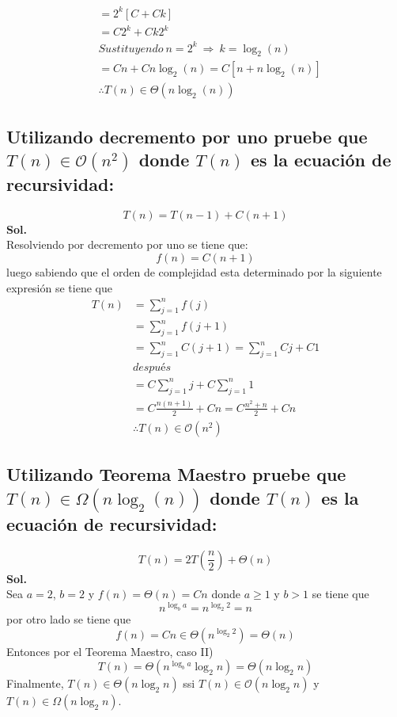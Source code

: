 \documentclass[12pt,twoside]{article}
\begin{document}
        \begin{align}
            &=2^{k}[C+Ck]\nonumber\\
            &=C2^{k}+Ck2^{k}\nonumber\\
            &Sustituyendo~n=2^{k}~\Rightarrow~k=\log_2{(n)}\nonumber\\
            &=Cn+Cn\log_2{(n)}=C[n+n\log_2{(n)}]\nonumber\\
            &\therefore T(n)\in \Theta(n\log_2{(n)})\nonumber
        \end{align}
    \subsection{Utilizando decremento por uno pruebe que \texorpdfstring{$T(n)\in\mathcal{O}(n^{2})$}{Lg} donde \texorpdfstring{$T(n)$}{Lg} es la ecuaci\'on de recursividad:}
    $$T(n)=T(n-1)+C(n+1)$$
    \textbf{Sol.}\\
    Resolviendo por decremento por uno se tiene que:
    $$f(n)=C(n+1)$$
    luego sabiendo que el orden de complejidad esta determinado por la siguiente expresi\'on se tiene que
    \begin{align}
            T(n)&=\sum_{j=1}^{n}{f(j)}\nonumber\\
            &=\sum_{j=1}^{n}{f(j+1)}\nonumber\\
            &=\sum_{j=1}^{n}{C(j+1)}=\sum_{j=1}^{n}{Cj+C1}\nonumber\\
            & \textit{despu\'es} \nonumber\\
            &= {C}\sum_{j=1}^{n}{j}+ {C}\sum_{j=1}^{n}{1}\nonumber\\
            &= C\frac{n(n+1)}{2}+Cn = C\frac{n^{2}+n}{2}+Cn\nonumber\\
            &\therefore T(n)\in \mathcal{O}(n^{2})\nonumber
    \end{align}
    \newpage
    \subsection{Utilizando Teorema Maestro pruebe que \texorpdfstring{$T(n)\in\Omega(n\log_2{(n)})$}{Lg} donde \texorpdfstring{$T(n)$}{Lg} es la ecuaci\'on de recursividad:}
    $$T(n)=2T(\frac{n}{2})+\Theta(n)$$
    \textbf{Sol.}\\
    Sea $a=2$, $b=2$ y $f(n)=\Theta(n)=Cn$ donde $a\geq1$ y $b>1$ se tiene que
    $$n^{\log_b{a}}=n^{\log_2{2}}=n$$
    por otro lado se tiene que
    $$f(n)=Cn\in\Theta(n^{\log_2{2}})=\Theta(n)$$
    Entonces por el Teorema Maestro, caso II)
    $$T(n)=\Theta(n^{\log_b{a}} \log_2{n})=\Theta(n\log_2{n})$$
    Finalmente, $T(n)\in\Theta(n\log_2{n})$ ssi $T(n)\in\mathcal{O}(n\log_2{n})$ y $T(n)\in\Omega(n\log_2{n})$.
    
\end{document}
